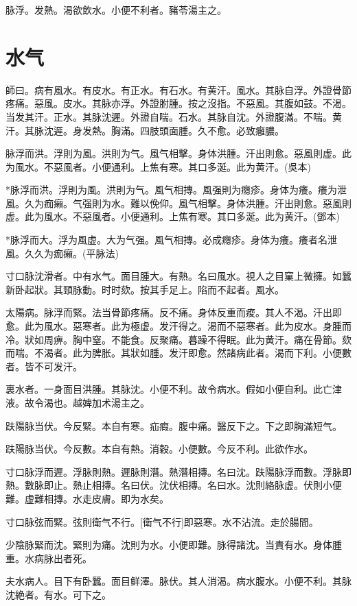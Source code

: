 \documentclass[12pt,oneside,UTF8,b5paper]{ctexbook}她她她她她她她
\begin{document}
脉浮。发熱。渴欲飲水。小便不利者。豬苓湯主之。

\chapter{水气}

師曰。病有風水。有皮水。有正水。有石水。有黄汗。風水。其脉自浮。外證骨節疼痛。惡風。皮水。其脉亦浮。外證胕腫。按之沒指。不惡風。其腹如鼓。不渴。当发其汗。正水。其脉沈遲。外證自喘。石水。其脉自沈。外證腹滿。不喘。黄汗。其脉沈遲。身发熱。胸滿。四肢頭面腫。久不愈。必致癰膿。

脉浮而洪。浮則为風。洪則为气。風气相擊。身体洪腫。汗出則愈。惡風則虚。此为風水。不惡風者。小便通利。上焦有寒。其口多涎。此为黄汗。(吳本)

*脉浮而洪。浮則为風。洪則为气。風气相摶。風强則为癮疹。身体为癢。癢为泄風。久为痂癩。气强則为水。難以俛仰。風气相擊。身体洪腫。汗出則愈。惡風則虚。此为風水。不惡風者。小便通利。上焦有寒。其口多涎。此为黄汗。(鄧本)

*脉浮而大。浮为風虚。大为气强。風气相摶。必成癮疹。身体为癢。癢者名泄風。久久为痂癩。(平脉法)

寸口脉沈滑者。中有水气。面目腫大。有熱。名曰風水。視人之目窠上微擁。如蠶新卧起狀。其頸脉動。时时欬。按其手足上。陷而不起者。風水。

太陽病。脉浮而緊。法当骨節疼痛。反不痛。身体反重而痠。其人不渴。汗出即愈。此为風水。惡寒者。此为極虚。发汗得之。渴而不惡寒者。此为皮水。身腫而冷。狀如周痹。胸中窒。不能食。反聚痛。暮躁不得眠。此为黄汗。痛在骨節。欬而喘。不渴者。此为脾胀。其狀如腫。发汗即愈。然諸病此者。渴而下利。小便數者。皆不可发汗。

裏水者。一身面目洪腫。其脉沈。小便不利。故令病水。假如小便自利。此亡津液。故令渴也。越婢加术湯主之。

趺陽脉当伏。今反緊。本自有寒。疝瘕。腹中痛。醫反下之。下之即胸滿短气。

趺陽脉当伏。今反數。本自有熱。消穀。小便數。今反不利。此欲作水。

寸口脉浮而遲。浮脉則熱。遲脉則潛。熱潛相摶。名曰沈。趺陽脉浮而數。浮脉即熱。數脉即止。熱止相摶。名曰伏。沈伏相摶。名曰水。沈則絡脉虚。伏則小便難。虚難相摶。水走皮膚。即为水矣。

寸口脉弦而緊。弦則衛气不行。[衛气不行]即惡寒。水不沾流。走於腸間。

少陰脉緊而沈。緊則为痛。沈則为水。小便即難。脉得諸沈。当責有水。身体腫重。水病脉出者死。

夫水病人。目下有卧蠶。面目鲜澤。脉伏。其人消渴。病水腹水。小便不利。其脉沈絶者。有水。可下之。
\end{document}

